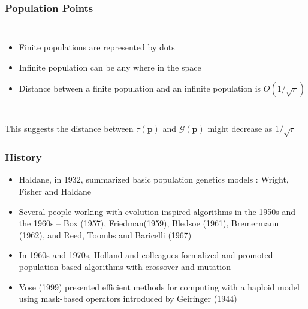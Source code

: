 \documentclass[aspectratio=169]{beamer}
\begin{document}
  \begin{frame}
    \frametitle{Population Points }
    \begin{columns}
	\centering
	\begin{itemize}
	  \item{Finite populations are represented by dots}
	  \item{Infinite population can be any where in the space}
	  \item{Distance between a finite population and an infinite population is  $O(1/\sqrt{r})$}
	\end{itemize}
    \end{columns}
    This suggests the distance between $\tau(\bm{p})$ and $\mathcal{G}(\bm{p})$ might decrease as $1/\sqrt{r}$
  \end{frame}
  
  \begin{frame}
    \frametitle{History}
    \begin{itemize}
      \item{Haldane, in 1932, summarized basic population genetics  models : Wright, Fisher and Haldane}
      \item{Several people working with evolution-inspired algorithms in the 1950s and the 1960s –  
      Box (1957), Friedman(1959), Bledsoe (1961), Bremermann (1962), and Reed, Toombs and Baricelli (1967) }
      \item{In 1960s and 1970s, Holland and colleagues formalized  and promoted population based algorithms with crossover and mutation }
      \item{Vose (1999) presented efficient methods for computing with a haploid model using mask-based operators introduced by Geiringer (1944)}
    \end{itemize}
  \end{frame}
  
\end{document}
